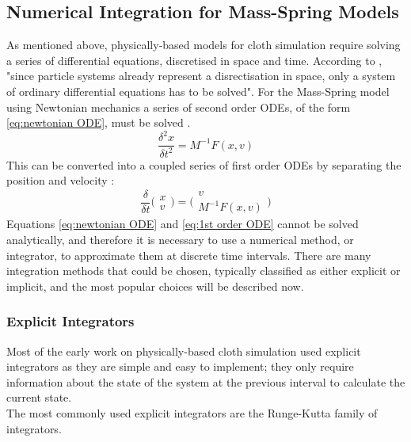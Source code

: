 \subsection{Numerical Integration for Mass-Spring Models}
As mentioned above, physically-based models for cloth simulation require solving a series of differential equations, discretised in space and time. According to \textcite[5]{Wacker2005a}, "since particle systems already represent a disrectisation in space, only a system of ordinary differential equations has to be solved". For the Mass-Spring model using Newtonian mechanics a series of second order ODEs, of the form \ref{eq:newtonian ODE}, must be solved \parencite[5]{Zink2007}.
\begin{equation}
\label{eq:newtonian ODE}
  \frac{\delta^{2}x}{\delta t^{2}} = M^{-1}F(x, v)
\end{equation}
This can be converted into a coupled series of first order ODEs by separating the position and velocity \parencite[5]{Zink2007}:
\begin{equation}
\label{eq:1st order ODE}
  \frac{\delta}{\delta t} \bigg(\begin{array}{c}  x \\ v \end{array}\bigg) = \bigg(\begin{array}{c}  v \\ M^{-1}F(x, v) \end{array}\bigg)
\end{equation}
Equations \ref{eq:newtonian ODE} and \ref{eq:1st order ODE} cannot be solved analytically, and therefore it is necessary to use a numerical method, or integrator, to approximate them at discrete time intervals. There are many integration methods that could be chosen, typically classified as either explicit or implicit, and the most popular choices will be described now.

\subsubsection{Explicit Integrators}
\label{sec:explicit}
Most of the early work on physically-based cloth simulation used explicit integrators as they are simple and easy to implement; they only require information about the state of the system at the previous interval to calculate the current state.
\\The most commonly used explicit integrators are the Runge-Kutta family of integrators.

